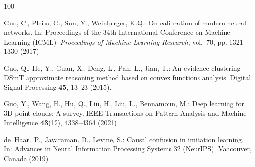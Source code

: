 \documentclass[graybox,envcountchap]{style/SNmono}
\begin{document}
\begin{thebibliography}{100}
{\par}
{\color{red} 
Guo, C., Pleiss, G., Sun, Y., Weinberger, K.Q.: On calibration of modern neural
  networks.
\newblock In: Proceedings of the 34th International Conference on Machine
  Learning (ICML), \emph{Proceedings of Machine Learning Research}, vol.~70,
  pp. 1321--1330 (2017)

\par}

Guo, Q., He, Y., Guan, X., Deng, L., Pan, L., Jian, T.: An evidence clustering
  {DSmT} approximate reasoning method based on convex functions analysis.
\newblock Digital Signal Processing \textbf{45}, 13--23 (2015).
\newblock {}


{\color{red} 
Guo, Y., Wang, H., Hu, Q., Liu, H., Liu, L., Bennamoun, M.: Deep learning for
  {3D} point clouds: A survey.
\newblock IEEE Transactions on Pattern Analysis and Machine Intelligence
  \textbf{43}(12), 4338--4364 (2021)

\par}
{\color{red} 
de~Haan, P., Jayaraman, D., Levine, S.: Causal confusion in imitation learning.
\newblock In: Advances in Neural Information Processing Systems 32 (NeurIPS).
  Vancouver, Canada (2019)

\par}
\end{thebibliography}
\end{document}

